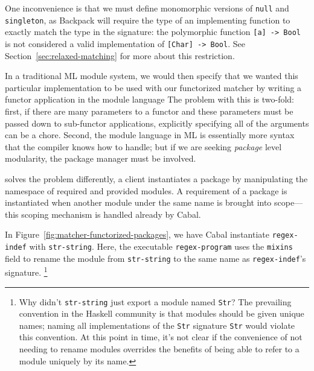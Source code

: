 One inconvenience is that we must define monomorphic
versions of \verb|null| and \verb|singleton|, as Backpack will require
the type of an implementing function to exactly match the type
in the signature: the polymorphic function \verb|[a] -> Bool| is not
considered a valid implementation of \verb|[Char] -> Bool|.  See
Section~\ref{sec:relaxed-matching} for more about this restriction.




In a traditional ML module system, we would then specify that we wanted this
particular implementation to be used with our functorized matcher by writing
a functor application in the module language
The problem with this is two-fold: first, if there are many parameters to a functor
and these parameters must be passed down to sub-functor applications, explicitly specifying
all of the arguments can be a chore.  Second, the module language in ML is essentially
more syntax that the compiler knows how to handle; but if we are seeking
\emph{package} level modularity, the package manager must be involved.

\Backpack{} solves the problem differently, a client instantiates a package
by manipulating the namespace of required and provided modules.
A requirement of a package is instantiated when
another module under the same name is brought into scope---this scoping
mechanism is handled already by Cabal.

In Figure~\ref{fig:matcher-functorized-packages}, we have Cabal instantiate
\verb|regex-indef| with \verb|str-string|.
Here, the executable \verb|regex-program| uses the
\verb|mixins| field to rename the module from \verb|str-string| to the
same name as \verb|regex-indef|'s signature.%
%
\footnote{Why didn't \texttt{str-string} just export
a module named \texttt{Str}?  The prevailing convention in the Haskell
community is that modules should be given unique names; naming all
implementations of the \texttt{Str} signature \texttt{Str} would violate
this convention.  At this point in time, it's not clear if the
convenience of not needing to rename modules overrides the benefits of
being able to refer to a module uniquely by its name.}

